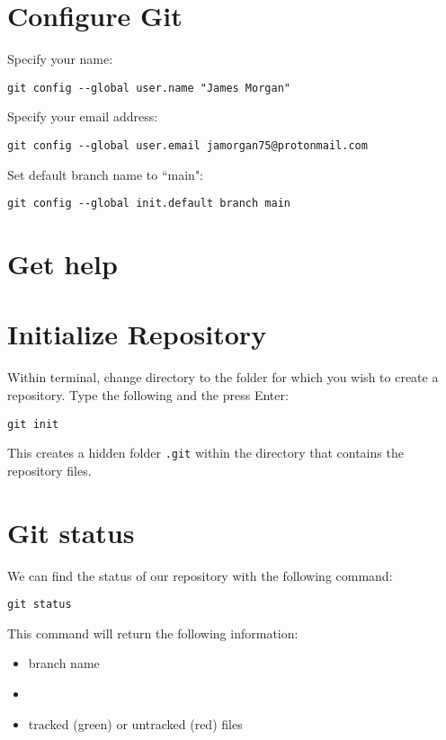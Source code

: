 \documentclass[12pt]{article}
\begin{document}
\section{Configure Git}
Specify your name:
\begin{Verbatim}
git config --global user.name "James Morgan"
\end{Verbatim}
Specify your email address:
\begin{Verbatim}
git config --global user.email jamorgan75@protonmail.com
\end{Verbatim}
Set default branch name to ``main":
\begin{Verbatim}
git config --global init.default branch main
\end{Verbatim}

\section{Get help}

\section{Initialize Repository}
Within terminal, change directory to the folder for which you wish to create a repository. Type the following and the press Enter:
\begin{Verbatim}
git init
\end{Verbatim}
This creates a hidden folder \verb|.git| within the directory that contains the repository files.\par






\newpage






\section{Git status}
We can find the status of our repository with the following command:
\begin{Verbatim}
git status
\end{Verbatim}
This command will return the following information:
\begin{itemize}[nosep]
\item branch name
\item
\item tracked (green) or untracked (red) files
\end{itemize}
\end{document}
